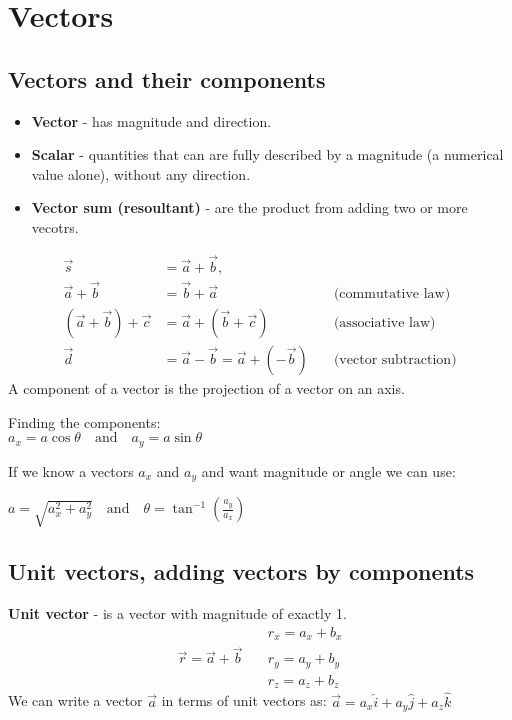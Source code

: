 \section{Vectors}

\subsection{Vectors and their components}
\begin{itemize}
    \item \textbf{Vector} - has magnitude and direction.
    \item \textbf{Scalar} - quantities that can are fully described by a magnitude (a numerical value alone), without any direction.
    \item \textbf{Vector sum (resoultant)} - are the product from adding two or more vecotrs.
\end{itemize}
\begin{align*}
\vec{s} &= \vec{a} + \vec{b}, \\[6pt]
\vec{a} + \vec{b} &= \vec{b} + \vec{a} \quad &\text{(commutative law)} \\[6pt]
(\vec{a} + \vec{b}) + \vec{c} &= \vec{a} + (\vec{b} + \vec{c}) \quad &\text{(associative law)} \\[6pt]
\vec{d} &= \vec{a} - \vec{b} = \vec{a} + (-\vec{b}) \quad &\text{(vector subtraction)}
\end{align*}
A component of a vector is the projection of a vector on an axis.
\begin{center}
Finding the components:\\
$a_x = a\cos\theta 
\quad \text{and} \quad 
a_y = a\sin\theta$
\end{center}
If we know a vectors $a_x$ and $a_y$ and want magnitude or angle we can use:
\begin{center}
$a = \sqrt{a^2_x + a^2_y} \quad \text{and} \quad \theta = \tan^{-1}(\frac{a_y}{a_x})$
\end{center}

\subsection{Unit vectors, adding vectors by components}
\textbf{Unit vector} - is a vector with magnitude of exactly 1.
\begin{align*}
      & r_x = a_x + b_x \\
\vec{r} = \vec{a} + \vec{b} \quad & r_y = a_y + b_y \\
      & r_z = a_z + b_z
\end{align*}
We can write a vector $\vec{a}$ in terms of unit vectors as: $\vec{a} = a_x \hat{i} + a_y \hat{j} + a_z \hat{k}$

